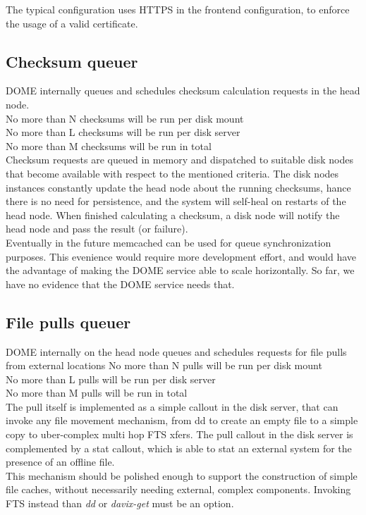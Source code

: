 \documentclass[a4paper,10pt]{scrreprt}
\begin{document}
The typical configuration uses HTTPS in the frontend configuration, to enforce the usage of a valid certificate.\\

\subsection{Checksum queuer}
 DOME internally queues and schedules checksum calculation requests in the head node.\\
 No more than N checksums will be run per disk mount\\
 No more than L checksums will be run per disk server\\
 No more than M checksums will be run in total\\

 Checksum requests are queued in memory and dispatched to suitable disk nodes that become available with respect to the mentioned criteria. The disk nodes instances constantly update the head node about the running checksums, hance there is no need for persistence,
 and the system will self-heal on restarts of the head node. When finished calculating a checksum, a disk node will notify the head node and pass the result (or failure).\\
 Eventually in the future memcached can be used for queue synchronization purposes. This evenience would require more development effort, and would have the
 advantage of making the DOME service able to scale horizontally. So far, we have no evidence that the DOME service needs that.\\

\subsection{File pulls queuer}
DOME internally on the head node queues and schedules requests for file pulls from external locations
 No more than N pulls will be run per disk mount\\
 No more than L pulls will be run per disk server\\
 No more than M pulls will be run in total\\

The pull itself is implemented as a simple callout in the disk server, that can invoke any file movement mechanism, from
dd to create an empty file to a simple copy to uber-complex multi hop FTS xfers.
The pull callout in the disk server is complemented by a stat callout, which is able to stat an external system for the presence of an offline file.\\
This mechanism should be polished enough to support the construction of simple file caches,
without necessarily needing external, complex components. Invoking FTS instead than \textit{dd} or \textit{davix-get} must be an option.\\
\end{document}

